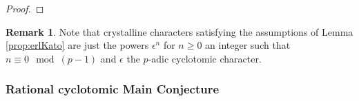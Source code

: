 \documentclass[10pt,reqno]{amsart}
\numberwithin{equation}{section}
\theoremstyle{plain}
\theoremstyle{definition}
\newtheorem{rmk}[thm]{Remark}
\theoremstyle{definition}
\theoremstyle{plain}
\theoremstyle{plain}
\theoremstyle{plain}
\theoremstyle{plain}
\theoremstyle{plain}
\theoremstyle{plain}
\DeclareMathOperator{\ord}{ord}
\newcommand{\Z}{\mathbb{Z}}
\newcommand{\Q}{\mathbb{Q}}
\newcommand{\bkappa}{\boldsymbol{\kappa}}
\DeclareMathOperator{\frob}{Frob}
\DeclareMathOperator{\loc}{loc}
\newcommand{\Lcal}{\mathcal{L}}
\newcommand{\rH}{\mathrm{H}}
\begin{document}
\begin{proof}
\end{proof}

\begin{rmk} 
Note that crystalline characters satisfying the assumptions of Lemma \ref{prop:erlKato} 
are just the powers $\epsilon^n$ for $n\geq 0$ an integer such that  $n\equiv 0 \mod (p-1)$
 and $\epsilon$ the $p$-adic cyclotomic character. 
\end{rmk}
\subsubsection{Rational cyclotomic Main Conjecture}
\end{document}
